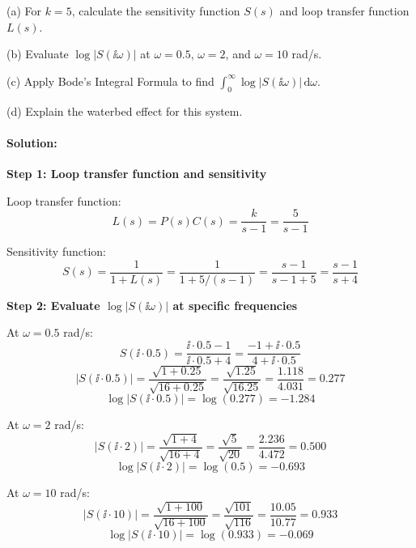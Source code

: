 \documentclass[11pt,a4paper]{article}
\begin{document}
(a) For $k = 5$, calculate the sensitivity function $S(s)$ and loop transfer function $L(s)$.

(b) Evaluate $\log|S(\ii\omega)|$ at $\omega = 0.5$, $\omega = 2$, and $\omega = 10$ rad/s.

(c) Apply Bode's Integral Formula to find $\int_0^\infty \log|S(\ii\omega)|\,\mathrm{d}\omega$.

(d) Explain the waterbed effect for this system.

\paragraph{Solution:}

\textbf{Step 1: Loop transfer function and sensitivity}

Loop transfer function:
\begin{equation}
L(s) = P(s)C(s) = \frac{k}{s-1} = \frac{5}{s-1}
\end{equation}

Sensitivity function:
\begin{equation}
S(s) = \frac{1}{1 + L(s)} = \frac{1}{1 + 5/(s-1)} = \frac{s-1}{s-1+5} = \frac{s-1}{s+4}
\end{equation}

\textbf{Step 2: Evaluate $\log|S(\ii\omega)|$ at specific frequencies}

At $\omega = 0.5$ rad/s:
\begin{equation}
S(\ii \cdot 0.5) = \frac{\ii \cdot 0.5 - 1}{\ii \cdot 0.5 + 4} = \frac{-1 + \ii \cdot 0.5}{4 + \ii \cdot 0.5}
\end{equation}
\begin{equation}
|S(\ii \cdot 0.5)| = \frac{\sqrt{1 + 0.25}}{\sqrt{16 + 0.25}} = \frac{\sqrt{1.25}}{\sqrt{16.25}} = \frac{1.118}{4.031} = 0.277
\end{equation}
\begin{equation}
\log|S(\ii \cdot 0.5)| = \log(0.277) = -1.284
\end{equation}

At $\omega = 2$ rad/s:
\begin{equation}
|S(\ii \cdot 2)| = \frac{\sqrt{1 + 4}}{\sqrt{16 + 4}} = \frac{\sqrt{5}}{\sqrt{20}} = \frac{2.236}{4.472} = 0.500
\end{equation}
\begin{equation}
\log|S(\ii \cdot 2)| = \log(0.5) = -0.693
\end{equation}

At $\omega = 10$ rad/s:
\begin{equation}
|S(\ii \cdot 10)| = \frac{\sqrt{1 + 100}}{\sqrt{16 + 100}} = \frac{\sqrt{101}}{\sqrt{116}} = \frac{10.05}{10.77} = 0.933
\end{equation}
\begin{equation}
\log|S(\ii \cdot 10)| = \log(0.933) = -0.069
\end{equation}
\end{document}
